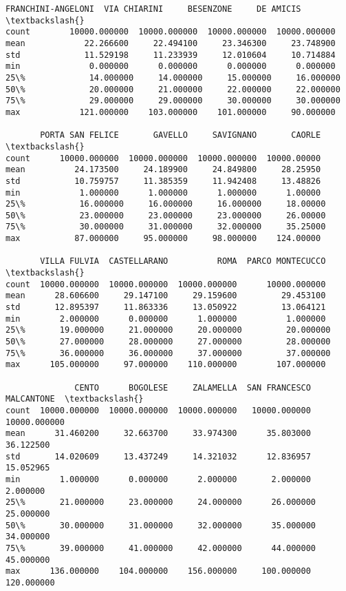 \documentclass[11pt]{article}
\begin{document}
\begin{tcolorbox}[breakable, size=fbox, boxrule=.5pt, pad at break*=1mm, opacityfill=0]
\begin{Verbatim}[commandchars=\\\{\}]
       FRANCHINI-ANGELONI  VIA CHIARINI     BESENZONE     DE AMICIS  \textbackslash{}
count        10000.000000  10000.000000  10000.000000  10000.000000
mean            22.266600     22.494100     23.346300     23.748900
std             11.529198     11.233939     12.010604     10.714884
min              0.000000      0.000000      0.000000      0.000000
25\%             14.000000     14.000000     15.000000     16.000000
50\%             20.000000     21.000000     22.000000     22.000000
75\%             29.000000     29.000000     30.000000     30.000000
max            121.000000    103.000000    101.000000     90.000000

       PORTA SAN FELICE       GAVELLO     SAVIGNANO       CAORLE  \textbackslash{}
count      10000.000000  10000.000000  10000.000000  10000.00000
mean          24.173500     24.189900     24.849800     28.25950
std           10.759757     11.385359     11.942408     13.48826
min            1.000000      1.000000      1.000000      1.00000
25\%           16.000000     16.000000     16.000000     18.00000
50\%           23.000000     23.000000     23.000000     26.00000
75\%           30.000000     31.000000     32.000000     35.25000
max           87.000000     95.000000     98.000000    124.00000

       VILLA FULVIA  CASTELLARANO          ROMA  PARCO MONTECUCCO  \textbackslash{}
count  10000.000000  10000.000000  10000.000000      10000.000000
mean      28.606600     29.147100     29.159600         29.453100
std       12.895397     11.863336     13.050922         13.064121
min        2.000000      0.000000      1.000000          1.000000
25\%       19.000000     21.000000     20.000000         20.000000
50\%       27.000000     28.000000     27.000000         28.000000
75\%       36.000000     36.000000     37.000000         37.000000
max      105.000000     97.000000    110.000000        107.000000

              CENTO      BOGOLESE     ZALAMELLA  SAN FRANCESCO    MALCANTONE  \textbackslash{}
count  10000.000000  10000.000000  10000.000000   10000.000000  10000.000000
mean      31.460200     32.663700     33.974300      35.803000     36.122500
std       14.020609     13.437249     14.321032      12.836957     15.052965
min        1.000000      0.000000      2.000000       2.000000      2.000000
25\%       21.000000     23.000000     24.000000      26.000000     25.000000
50\%       30.000000     31.000000     32.000000      35.000000     34.000000
75\%       39.000000     41.000000     42.000000      44.000000     45.000000
max      136.000000    104.000000    156.000000     100.000000    120.000000


\end{Verbatim}
\end{tcolorbox}
\end{document}
